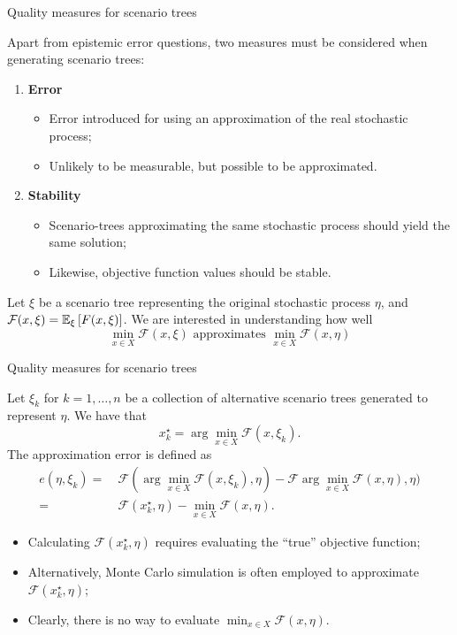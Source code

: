 \begin{frame}{Quality measures for scenario trees}

	Apart from \alert{epistemic error} questions, two measures must be considered when generating scenario trees:
	
	\begin{enumerate}
		\item {\bf Error}
		\begin{itemize}
			\item Error introduced for using an \alert{approximation} of the real stochastic process;
			\item Unlikely to be measurable, but possible to be approximated.
		\end{itemize}
		\vfill
		\item {\bf Stability}
		\begin{itemize}
			\item Scenario-trees approximating the same stochastic process should yield the same solution;
			\item Likewise, objective function values should be stable.
		\end{itemize}		
	\end{enumerate}
	
	Let $\xi$ be a scenario tree representing the original stochastic process $\eta$, and $\mathcal{F}(x, \xi) = \mathbb{E}_\xi\left[ F(x,\xi) \right]$. We are interested in understanding how well
		$$
		\min_{x \in X} \mathcal{F}(x, \xi) \text{ approximates }
		\min_{x \in X} \mathcal{F}(x, \eta)
		$$		
	
\end{frame}


\begin{frame}{Quality measures for scenario trees}

	Let $\xi_k$ for $k=1,\dots,n$ be a collection of alternative scenario trees generated to represent $\eta$. We have that
	$$
		x_k^\star = \arg\min_{x \in X} \mathcal{F}(x, \xi_k).
	$$ 
	The \alert{approximation error} {\small \cite{pflug2001scenario}} is defined as 
	\begin{align*}
		e(\eta, \xi_k) =~ & \mathcal{F}(\arg\min_{x \in X} \mathcal{F}(x, \xi_k), \eta) - 	\mathcal{F}\arg\min_{x \in X} \mathcal{F}(x, \eta), \eta) \\
		=~ & \mathcal{F}(x_k^\star, \eta) - \min_{x \in X} \mathcal{F}(x, \eta). 
	\end{align*}
	\pause

	\vspace{-18pt}
	\begin{itemize}
		\item Calculating $\mathcal{F}(x_k^\star, \eta)$ requires evaluating the ``true'' objective function;
		\item Alternatively, \alert{Monte Carlo simulation} is often employed to approximate $\mathcal{F}(x_k^\star, \eta)$;
		\item Clearly, there is no way to evaluate $\min_{x \in X} \mathcal{F}(x, \eta)$.
	\end{itemize}

\end{frame}


